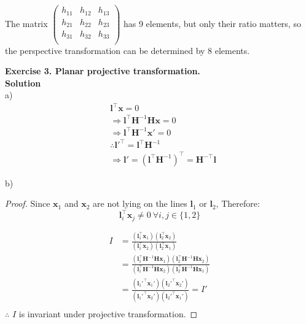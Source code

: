 \documentclass[letterpaper, 11pt]{article}
\begin{document}
The matrix $\begin{pmatrix}
        h_{11} & h_{12} & h_{13} \\
        h_{21} & h_{22} & h_{23} \\
        h_{31} & h_{32} & h_{33} \\
    \end{pmatrix}$
has 9 elements, but only their ratio matters, so the perspective transformation can be determined by 8 elements.


\textbf{Exercise 3. Planar projective transformation.}\\

\textbf{Solution}\\

a)
\begin{align*}
     & \textbf{l}^\top\textbf{x}=0                                                                    \\
     & \Rightarrow \textbf{l}^\top\textbf{H}^{-1}\textbf{H}\textbf{x}=0                               \\
     & \Rightarrow \textbf{l}^\top\textbf{H}^{-1}\textbf{x}'=0                                        \\
     & \therefore \textbf{l}'^\top = \textbf{l}^\top\textbf{H}^{-1}                                   \\
     & \Rightarrow \textbf{l}' = (\textbf{l}^\top\textbf{H}^{-1})^\top = \textbf{H}^{-\top}\textbf{l}
\end{align*}

b)
\begin{proof}
    Since $\pmb{x}_{1}$ and $\pmb{x}_{2}$ are not lying on the lines $\pmb{l}_{1}$ or $\pmb{l}_{2}$,
    Therefore:
    $$
        \pmb{l}_{i}^\top \pmb{x}_{j} \neq 0\ \forall i, j \in \{1, 2\}
    $$

    \begin{align*}
        I & = \frac{(\pmb{l}_{1}^\top \pmb{x}_{1})(\pmb{l}_{2}^\top \pmb{x}_{2})}{(\pmb{l}_{1}^\top \pmb{x}_{2})(\pmb{l}_{2}^\top \pmb{x}_{1})}                                                                                                     \\
          & = \frac{(\pmb{l}_{1}^\top \textbf{H}^{-1}\textbf{H}\pmb{x}_{1})(\pmb{l}_{2}^\top \textbf{H}^{-1}\textbf{H}\pmb{x}_{2})}{(\pmb{l}_{1}^\top \textbf{H}^{-1}\textbf{H}\pmb{x}_{2})(\pmb{l}_{2}^\top \textbf{H}^{-1}\textbf{H}\pmb{x}_{1})} \\
          & = \frac{(\pmb{l}_{1}'^\top \pmb{x}_{1}')(\pmb{l}_{2}'^\top \pmb{x}_{2}')}{(\pmb{l}_{1}'^\top \pmb{x}_{2}')(\pmb{l}_{2}'^\top \pmb{x}_{1}')} = I'                                                                                        \\
    \end{align*}
    $\therefore$ $I$ is invariant under projective transformation.
\end{proof}
\end{document}
